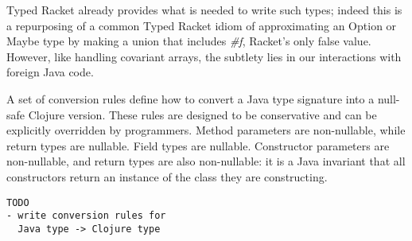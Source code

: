 \documentclass[preprint,10pt]{sigplanconf}
\begin{document}
Typed Racket already provides what is needed to write such types; indeed this is a repurposing
of a common Typed Racket idiom of approximating an Option or Maybe type by
making a union that includes \emph{\#f}, Racket's only false value.
However, like handling covariant arrays, the subtlety lies in our interactions with foreign
Java code.

A set of conversion rules define how to convert a Java type signature into a null-safe
Clojure version. These rules are designed to be conservative and can be explicitly overridden
by programmers. Method parameters are non-nullable, while return types are nullable.
Field types are nullable. Constructor parameters are non-nullable, and return types
are also non-nullable: it is a Java invariant that all constructors return an instance
of the class they are constructing.

\begin{verbatim}
TODO 
- write conversion rules for 
  Java type -> Clojure type
\end{verbatim}

%

%







%
%
\end{document}
